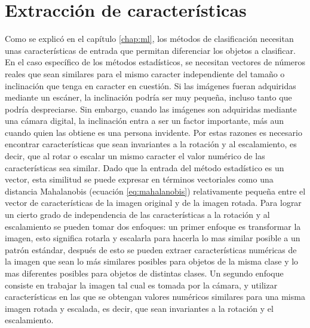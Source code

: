 \documentclass[a4paper, 11pt, oneside]{report}
\begin{document}
\section{Extracción de características}
Como se explicó en el capítulo \ref{chap:ml}, los métodos de clasificación necesitan unas características de entrada que permitan diferenciar los objetos a clasificar. En el caso específico de los métodos estadísticos, se necesitan vectores de números reales que sean similares para el mismo caracter independiente del tamaño o inclinación que tenga en caracter en cuestión. Si las imágenes fueran adquiridas mediante un escáner, la inclinación podría ser muy pequeña, incluso tanto que podría despreciarse. Sin embargo, cuando las imágenes son adquiridas mediante una cámara digital, la inclinación entra a ser un factor importante, más aun cuando quien las obtiene es una persona invidente. Por estas razones es necesario encontrar características que sean invariantes a la rotación y al escalamiento, es decir, que al rotar o escalar un mismo caracter el valor numérico de las características sea similar. Dado que la entrada del método estadístico es un vector, esta similitud se puede expresar en términos vectoriales como una distancia Mahalanobis (ecuación \ref{eq:mahalanobis}) relativamente pequeña entre el vector de características de la imagen original y de la imagen rotada.
Para lograr un cierto grado de independencia de las características a la rotación y al escalamiento se pueden tomar dos enfoques: un primer enfoque es transformar la imagen, esto significa rotarla y escalarla para hacerla lo mas similar posible a un patrón estándar, después de esto se pueden extraer características numéricas de la imagen que sean lo más similares posibles para objetos de la misma clase y lo mas diferentes posibles para objetos de distintas clases. Un segundo enfoque consiste en trabajar la imagen tal cual es tomada por la cámara, y utilizar características en las que se obtengan valores numéricos similares para una misma imagen rotada y escalada, es decir, que sean invariantes a la rotación y el escalamiento.
\end{document}
